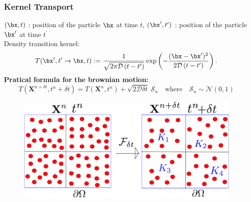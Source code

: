 \documentclass[aspectratio=169]{beamer}
\begin{document}
\begin{frame}
  \frametitle{Kernel Transport}
  $(\bx,t)$ : position of the particle $\bx$ at time $t$,   $(\bx^{\prime},t^{\prime})$ : position of the particle $\bx^{\prime}$ at time $t^{\prime}$
  \\
  \vspace*{0.2 cm}
  Density transition kernel:
  \begin{equation*}
    T(\bx^{\prime},t^{\prime} \rightarrow \bx,t) :=
    \frac{1}{\sqrt{2 \pi \mathcal{D} \left(t-t^{\prime}\right)}}
    \exp \left(-\frac{(\bx-\bx^{\prime})^2}{2 \mathcal{D} \left(t-t^{\prime}\right)}\right).
  \end{equation*}
  \textcolor{cadmiumgreen}{\textbf{Pratical formula for the brownian motion:}}
  \begin{equation*}
T({\bm X}^{n+\delta t}, t^{n} + \delta t) = T({\bm X}^{n},t^{n}) + \sqrt{2 \mathcal{D} \delta t} \ \mathcal{S}_n \quad \text{where} \quad \mathcal{S}_n \sim \mathcal{N}(0,1)
    \end{equation*}
  \begin{figure}
    \centering
\includegraphics[scale=0.33]{image/Sampling_2D-cropped}
    \end{figure}
\end{frame}
%
\end{document}
